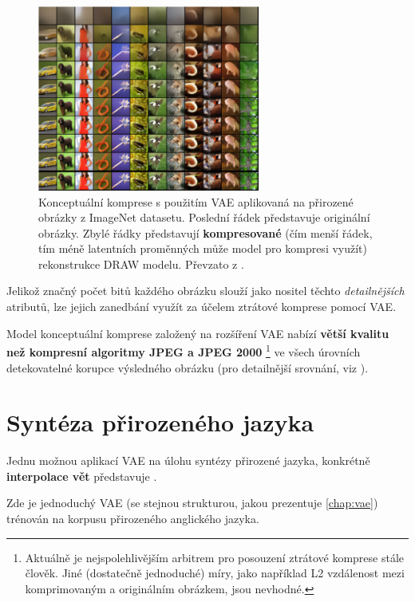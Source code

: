 \begin{figure}[H]
    \centering
    \includegraphics[width=0.65\textwidth]{figures/applications/conceptual_compression_gregor.png}
    \caption{Konceptuální komprese s použitím VAE aplikovaná na přirozené obrázky z ImageNet datasetu. Poslední řádek představuje originální obrázky. Zbylé řádky představují \textbf{kompresované} (čím menší řádek, tím méně latentních proměnných může model pro kompresi využít) rekonstrukce DRAW modelu. Převzato z \cite{Gregor2016}.}
    \label{fig:conceptual_compression_gregor}
\end{figure}

Jelikož značný počet bitů každého obrázku slouží jako nositel těchto \emph{detailnějších} atributů, lze jejich zanedbání využít za účelem ztrátové komprese pomocí VAE.

Model konceptuální komprese založený na rozšíření VAE nabízí \textbf{větší kvalitu než kompresní algoritmy JPEG a JPEG 2000}
\footnote{Aktuálně je nejspolehlivějším arbitrem pro posouzení ztrátové komprese stále člověk. Jiné (dostatečně jednoduché) míry, jako například L2 vzdálenost mezi komprimovaným a originálním obrázkem, jsou nevhodné.} ve všech úrovních detekovatelné korupce výsledného obrázku (pro detailnější srovnání, viz \cite{Gregor2016}).

\newpage
\section{Syntéza přirozeného jazyka}
Jednu možnou aplikací VAE na úlohu syntézy přirozené jazyka, konkrétně \textbf{interpolace vět} představuje \cite{Bowman2016}.

Zde je jednoduchý VAE (se stejnou strukturou, jakou prezentuje \autoref{chap:vae}) trénován na korpusu přirozeného anglického jazyka.

